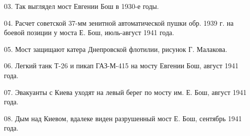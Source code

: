 03. Так выглядел мост Евгении Бош в 1930-е годы.

04. Расчет советской 37-мм зенитной автоматической пушки обр. 1939 г. на боевой
позиции у моста Е. Бош, июль-август 1941 года.

05. Мост защищают катера Днепровской флотилии, рисунок Г. Малакова.

06. Легкий танк Т-26 и пикап ГАЗ-М-415 на мосту Евгении Бош, август 1941 года.

07. Эвакуанты с Киева уходят на левый берег по мосту им. Е. Бош, август 1941
года.

08. Дым над Киевом, вдалеке виден разрушенный мост Е. Бош, сентябрь 1941 года.

